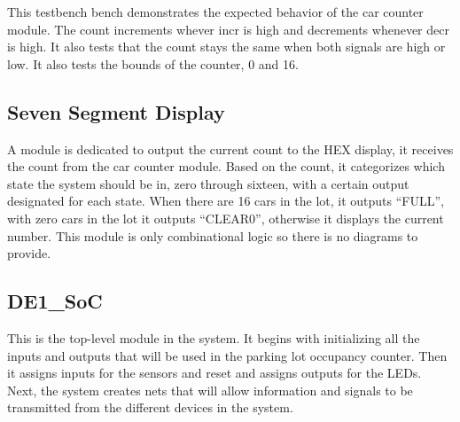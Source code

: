 \documentclass[11pt, titlepage]{article}
\begin{document}
            This testbench bench demonstrates the expected behavior of the car counter module. The count increments whever incr is high and decrements whenever decr is high. It also tests that the count stays the same when both signals are high or low. It also tests the bounds of the counter, 0 and 16.
        
        \subsection{Seven Segment Display}
            A module is dedicated to output the current count to the HEX display, it receives the count from the car counter module. Based on the count, it categorizes which state the system should be in, zero through sixteen, with a certain output designated for each state. When there are 16 cars in the lot, it outputs “FULL”, with zero cars in the lot it outputs “CLEAR0”, otherwise it displays the current number. This module is only combinational logic so there is no diagrams to provide.
        
        \subsection{DE1\_SoC}
            This is the top-level module in the system. It begins with initializing all the inputs and outputs that will be used in the parking lot occupancy counter. Then it assigns inputs for the sensors and reset and assigns outputs for the LEDs. Next, the system creates nets that will allow information and signals to be transmitted from the different devices in the system.
\end{document}
